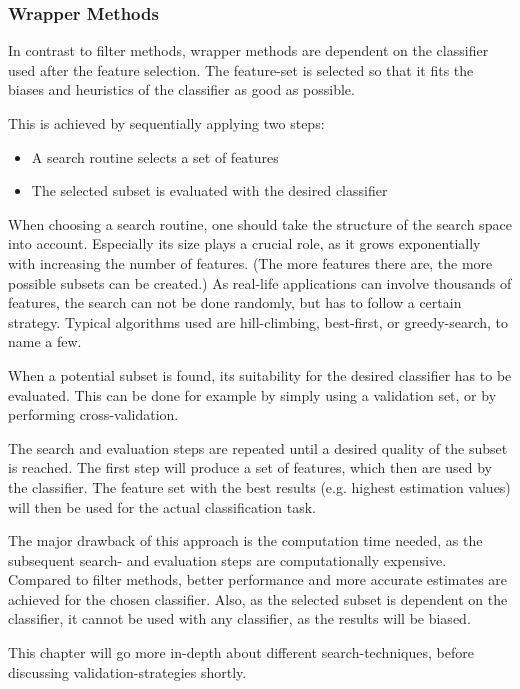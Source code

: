 \subsubsection{Wrapper Methods}
\label{sec:methods.flat.wrapper}


In contrast to filter methods, wrapper methods are dependent on the classifier used after the feature selection. 
The feature-set is selected so that it fits the biases and heuristics of the classifier as good as possible. 

This is achieved by sequentially applying two steps: 

\begin{itemize}
  \item A search routine selects a set of features 
  \item The selected subset is evaluated with the desired classifier
\end{itemize}

When choosing a search routine, one should take the structure of the search space into account.
Especially its size plays a crucial role, as it grows exponentially with increasing  the number of features. 
(The more features there are, the more possible subsets can be created.) 
As real-life applications can involve thousands of features, the search can not be done randomly, 
but has to follow a certain strategy. 
Typical algorithms used are hill-climbing, best-first, or greedy-search, to name a few.

When a potential subset is found, its suitability for the desired classifier has to be evaluated. 
This can be done for example by simply using a validation set, or by performing cross-validation.

The search and evaluation steps are repeated until a desired quality of the subset is reached. 
The first step will produce a set of features, which then are used by the classifier. 
The feature set with the best results (e.g. highest estimation values) will
then be used for the actual classification task.


The major drawback of this approach is the computation time needed, as the subsequent search- and evaluation steps are computationally expensive. 
Compared to filter methods, better performance and more accurate estimates are achieved for the chosen classifier.
Also, as the selected subset is dependent on the classifier, it cannot be used with any classifier, as the results will be biased.

This chapter will go more in-depth about different search-techniques, before discussing validation-strategies shortly. 







